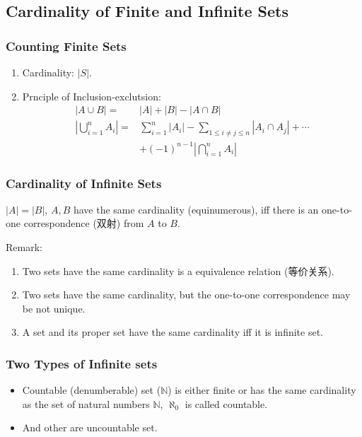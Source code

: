 \subsection{Cardinality of Finite and Infinite Sets}

\subsubsection{Counting Finite Sets}

\begin{enumerate}
    \item Cardinality: $|S|$.
    \item Prnciple of Inclusion-exclutsion:
    \begin{align*}
        |A\cup B|=& |A|+|B|-|A\cap B|\\
        \left|\bigcup_{i=1}^n A_i\right|=&\sum_{i=1}^n \left| A_i \right|-\sum_{1\le i \ne j \le n } \left| A_i\cap A_j \right| + \cdots \\
        &+ (-1)^{n-1} \left| \bigcap_{i=1}^n A_i \right|
    \end{align*}
\end{enumerate}

\subsubsection{Cardinality of Infinite Sets}
$|A|=|B|$, $A,B$ have the same cardinality (equinumerous), iff there is an one-to-one correspondence (双射) from $A$ to $B$.

Remark: 
\begin{enumerate}
    \item Two sets have the same cardinality is a equivalence relation (等价关系). 
    \item Two sets have the same cardinality, but the one-to-one correspondence may be not unique. 
    \item A set and its proper set have the same cardinality iff it is infinite set. 
\end{enumerate}

\subsubsection{Two Types of Infinite sets}


\begin{itemize}
    \item Countable (denumberable) set ($\mathbb{N}$) is either finite or has the same cardinality as the set of natural numbers $\mathbb{N}$, $\aleph_0$ is called countable. 
    \item  And other are  uncountable set. 
\end{itemize}


